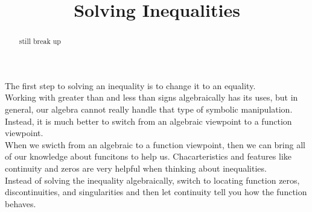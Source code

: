 \documentclass{ximera}
\title{Solving Inequalities}
\begin{document}
\begin{abstract}
still break up
\end{abstract}
\maketitle



The first step to solving an inequality is to change it to an equality. \\


Working with greater than and less than signs algebraically has its uses, but in general, our algebra cannot really handle that type of symbolic manipulation. \\


Instead, it is much better to switch from an algebraic viewpoint to a function viewpoint. \\


When we swicth from an algebraic to a function viewpoint, then we can bring all of our knowledge about funcitons to help us. Chacarteristics and features like continuity and zeros are very helpful when thinking about inequalities. \\


Instead of solving the inequality algebraically, switch to locating function zeros, discontinuities, and singularities and then let continuity tell you how the function behaves. \\
\end{document}
